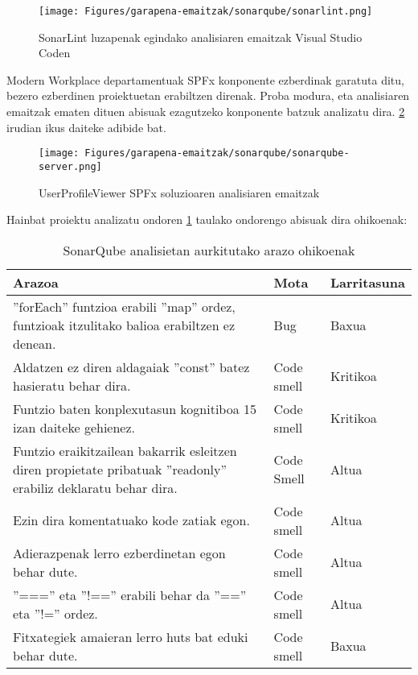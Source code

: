 \begin{figure}[H]
\centering
\texttt{[image: Figures/garapena-emaitzak/sonarqube/sonarlint.png]}
\caption{SonarLint luzapenak egindako analisiaren emaitzak Visual Studio Coden}
\label{img:sonarlint}
\end{figure}

Modern Workplace departamentuak SPFx konponente ezberdinak garatuta ditu, bezero ezberdinen proiektuetan erabiltzen direnak.
Proba modura, eta analisiaren emaitzak ematen dituen abisuak ezagutzeko konponente batzuk analizatu dira. \ref{img:sonarqube-analisia} irudian ikus daiteke adibide bat. 

\begin{figure}[H]
\centering
\texttt{[image: Figures/garapena-emaitzak/sonarqube/sonarqube-server.png]}
\caption{UserProfileViewer SPFx soluzioaren analisiaren emaitzak}
\label{img:sonarqube-analisia}
\end{figure}

Hainbat proiektu analizatu ondoren \ref{table:sq-analisia-emaitzak} taulako ondorengo abisuak dira ohikoenak:
\begin{table}[ht]
\centering
{}
\def\arraystretch{1.5}%
\begin{tabular}{ p{9cm} p{2.25cm} p{2.25cm}  }
\hline
\textbf{Arazoa} & \textbf{Mota} & \textbf{Larritasuna} \\
\hline
''forEach'' funtzioa erabili ''map'' ordez, funtzioak itzulitako balioa erabiltzen ez denean.  & Bug & Baxua \\
Aldatzen ez diren aldagaiak ''const'' batez hasieratu behar dira. & Code smell   & Kritikoa \\
Funtzio baten konplexutasun kognitiboa 15 izan daiteke gehienez.  & Code smell & Kritikoa \\
Funtzio eraikitzailean bakarrik esleitzen diren propietate pribatuak ''readonly'' erabiliz deklaratu behar dira. & Code Smell& Altua \\
Ezin dira komentatuako kode zatiak egon. & Code smell & Altua \\
Adierazpenak lerro ezberdinetan egon behar dute. & Code smell & Altua   \\
''==='' eta ''!=='' erabili behar da ''=='' eta ''!='' ordez. & Code smell & Altua \\
Fitxategiek amaieran lerro huts bat eduki behar dute. & Code smell & Baxua \\
\hline
\end{tabular}
\caption{SonarQube analisietan aurkitutako arazo ohikoenak}
\label{table:sq-analisia-emaitzak}
\end{table}

